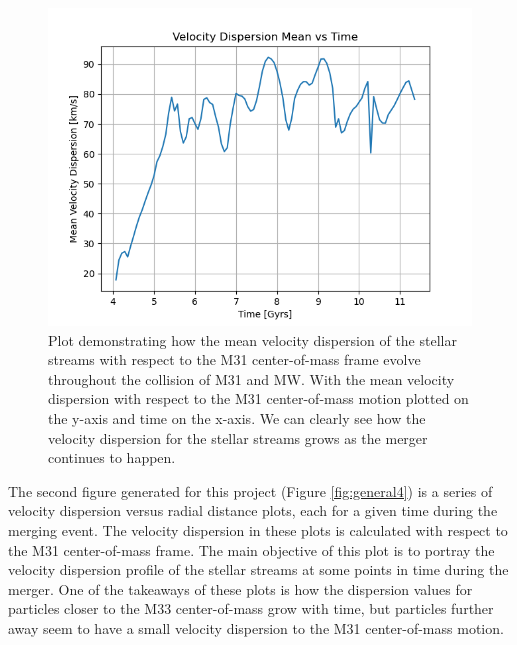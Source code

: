 \documentclass[linenumbers,trackchanges,twocolumn]{aastex7}
\begin{document}
\begin{figure}
    \centering
    \includegraphics[width=\linewidth]{dispersion_vs_time.png}
    \caption{Plot demonstrating how the mean velocity dispersion of the stellar streams with respect to the M31 center-of-mass frame evolve throughout the collision of M31 and MW. With the mean velocity dispersion with respect to the M31 center-of-mass motion plotted on the y-axis and time on the x-axis. We can clearly see how the velocity dispersion for the stellar streams grows as the merger continues to happen.}
    \label{fig:general3}
\end{figure}

The second figure generated for this project (Figure \ref{fig:general4}) is a series of velocity dispersion versus radial distance plots, each for a given time during the merging event. The velocity dispersion in these plots is calculated with respect to the M31 center-of-mass frame. The main objective of this plot is to portray the velocity dispersion profile of the stellar streams at some points in time during the merger. One of the takeaways of these plots is how the dispersion values for particles closer to the M33 center-of-mass grow with time, but particles further away seem to have a small velocity dispersion to the M31 center-of-mass motion.
\end{document}
